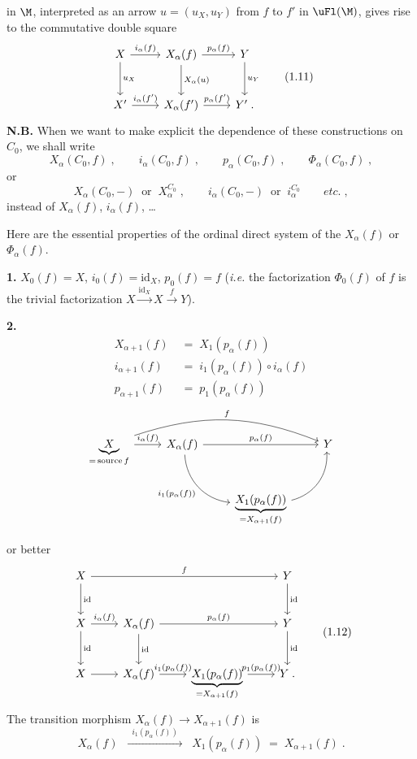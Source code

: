 in $\M$, interpreted as an arrow $u = (u_X, u_Y)$ from $f$ to $f'$ in $\uFl(\M)$, gives rise to the commutative double square
\[
\begin{tikzcd}[row sep=large]
X \arrow[r, "i_\alpha(f)"] \arrow[d, "u_X"] & X_\alpha(f) \arrow[r, "p_\alpha(f)"] \arrow[d, "X_\alpha(u)"] & Y \arrow[d, "u_Y"] \\
X' \arrow[r, "{i_\alpha(f')}"] & X_\alpha(f') \arrow[r, "{p_\alpha(f')}"] & Y' \;.
\end{tikzcd}
\tag*{(1.11)}
\]
\textbf{N.B.} When we want to make explicit the dependence of these constructions on $C_0$, we shall write
\[
X_\alpha(C_0,f) \;, \qquad i_\alpha(C_0,f) \;, \qquad p_\alpha(C_0,f) \;, \qquad \Phi_\alpha(C_0,f) \;,
\]
or
\[
X_\alpha(C_0,-) \;\;\text{or}\;\; X_\alpha^{C_0} \;, \qquad i_\alpha(C_0,-) \;\;\text{or}\;\; i_\alpha^{C_0} \qquad \textit{etc.} \;,
\]
instead of $X_\alpha(f)$, $i_\alpha(f)$, \dots

Here are the essential properties of the ordinal direct system of the $X_\alpha(f)$ or $\Phi_\alpha(f)$.


\textbf{1.} $X_0(f) = X$, $i_0(f) = \mathrm{id}_X$, $p_0(f) = f$ (\textit{i.e.} the factorization $\Phi_0(f)$ of $f$ is the trivial factorization $X \xrightarrow{\mathrm{id}_X} X \xrightarrow{f} Y$).

\textbf{2.}
\[
\begin{aligned}
X_{\alpha+1}(f) &\;=\; X_1(p_\alpha(f)) \\
i_{\alpha+1}(f) &\;=\; i_1(p_\alpha(f)) \circ i_\alpha(f) \\
p_{\alpha+1}(f) &\;=\; p_1(p_\alpha(f))
\end{aligned}
\]
\[
\begin{tikzcd}
\underbrace{X}_{= \,\mathrm{source}\, f} \arrow[r, "i_\alpha(f)"] \arrow[rrr, bend left=20, "f"] & X_\alpha(f) \arrow[rr, "p_\alpha(f)"] \arrow[dr, bend right=40, "i_1(p_\alpha(f))"'] & & Y \\
& & \underbrace{X_1(p_\alpha(f))}_{= X_{\alpha+1}(f)} \arrow[ur, bend right=40] &
\end{tikzcd}
\]

\clearpage


or better
\[
\begin{tikzcd}[row sep=large]
X \arrow[rrr, "f"] \arrow[d, "\mathrm{id}"] & & & Y \arrow[d, "\mathrm{id}"] \\
X \arrow[r, "i_\alpha(f)"] \arrow[d, "\mathrm{id}"] & X_\alpha(f) \arrow[rr, "p_\alpha(f)"] \arrow[d, "\mathrm{id}"] & & Y \arrow[d, "\mathrm{id}"] \\
X \arrow[r] & X_\alpha(f) \arrow[r, "i_1(p_\alpha(f))"] & \underbrace{X_1(p_\alpha(f))}_{= X_{\alpha+1}(f)} \arrow[r, "p_1(p_\alpha(f))"] & Y \;.
\end{tikzcd}
\tag*{(1.12)}
\]
The transition morphism $X_\alpha(f) \longrightarrow X_{\alpha+1}(f)$ is
\[
X_\alpha(f) \;\; \xrightarrow{\;\;i_1(p_\alpha(f))\;\;} \;\; X_1(p_\alpha(f)) \;=\; X_{\alpha+1}(f) \;.
\]

